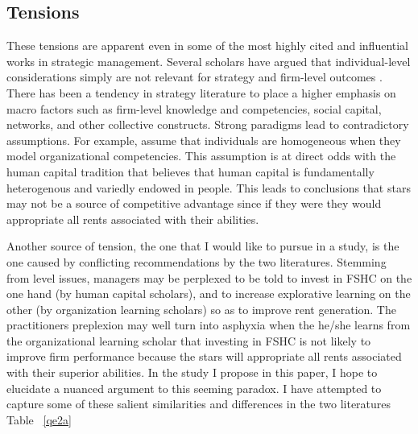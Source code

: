 \documentclass[12pt,letterpaper]{article}
\begin{document}
\subsection{Tensions}
These tensions are apparent even in some of the most highly cited and influential works in strategic management. Several scholars have  argued that individual-level considerations simply are not relevant for strategy and firm-level outcomes \citep{Henderson1994, Kogut1992, Kogut1996, Nahapiet1998, Spender1996}. There has been a tendency in strategy literature to place a higher emphasis on macro factors such as firm-level knowledge and competencies, social capital, networks, and other collective constructs. Strong paradigms lead to contradictory assumptions. For example, \citep{Henderson1994} assume that individuals are homogeneous when they model organizational competencies. This assumption is at direct odds with the human capital tradition that believes that human capital is fundamentally heterogenous and variedly endowed in people. This leads to conclusions that stars may not be a source of competitive advantage since if they were they would appropriate all rents associated with their abilities. \par

Another source of tension, the one that I would like to pursue in a study, is the one caused by conflicting recommendations by the two literatures. Stemming from level issues, managers may be perplexed to be told to invest in FSHC on the one hand (by human capital scholars), and to increase explorative learning on the other (by organization learning scholars) so as to improve rent generation. The practitioner\textquotesingle s preplexion may well turn into asphyxia when the he/she learns from the organizational learning scholar that investing in FSHC is not likely to improve firm performance because the stars will appropriate all rents associated with their superior abilities. In the study I propose in this paper, I hope to elucidate a nuanced argument to this seeming paradox. I have attempted to capture some of these salient similarities and differences in the two literatures Table ~\ref{qe2a}
\end{document}
